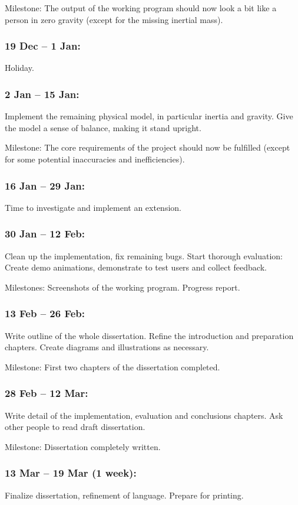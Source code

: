 Milestone: The output of the working program should now look a bit
like a person in zero gravity (except for the missing inertial mass).

\subsubsection*{19 Dec -- 1 Jan:}
Holiday.

\subsubsection*{2 Jan -- 15 Jan:}
Implement the remaining physical model, in particular inertia and
gravity. Give the model a sense of balance, making it stand upright.

Milestone: The core requirements of the project should now be
fulfilled (except for some potential inaccuracies and inefficiencies).

\subsubsection*{16 Jan -- 29 Jan:}
Time to investigate and implement an extension.

\subsubsection*{30 Jan -- 12 Feb:}
Clean up the implementation, fix remaining bugs. Start thorough
evaluation: Create demo animations, demonstrate to test users and
collect feedback.

Milestones: Screenshots of the working program. Progress report.

\subsubsection*{13 Feb -- 26 Feb:}
Write outline of the whole dissertation. Refine the introduction and
preparation chapters. Create diagrams and illustrations as necessary.

Milestone: First two chapters of the dissertation completed.

\subsubsection*{28 Feb -- 12 Mar:}
Write detail of the implementation, evaluation and conclusions
chapters. Ask other people to read draft dissertation.

Milestone: Dissertation completely written.

\subsubsection*{13 Mar -- 19 Mar (1 week):}
Finalize dissertation, refinement of language. Prepare for printing.

%
